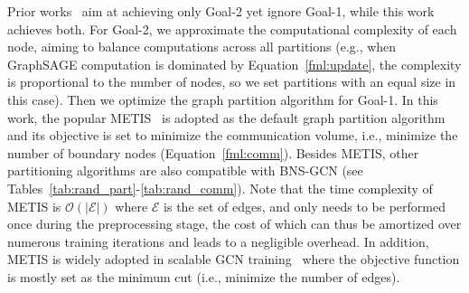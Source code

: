 \documentclass{article}
\begin{document}
Prior works~\citep{tripathy2020reducing,zheng2020distdgl} aim at achieving only Goal-2 yet ignore Goal-1, while this work achieves both.
For Goal-2, we approximate the computational complexity of each node, aiming to balance computations across all partitions (e.g., when GraphSAGE computation is dominated by Equation~\ref{fml:update}, the complexity is proportional to the number of nodes, so we set partitions with an equal size in this case).
Then we optimize the graph partition algorithm for Goal-1.
In this work, the popular METIS~\citep{karypis1998fast} is adopted as the default graph partition algorithm and its objective is set to minimize the communication volume, i.e., minimize the number of boundary nodes (Equation~\ref{fml:comm}).
Besides METIS, other partitioning algorithms are also compatible with BNS-GCN (see Tables~\ref{tab:rand_part}-\ref{tab:rand_comm}). 
Note that the time complexity of METIS is $\mathcal{O}(|\mathcal{E}|)$ where $\mathcal{E}$ is the set of edges, and only needs to be performed once during the preprocessing stage, the cost of which can thus be amortized over numerous training iterations and leads to a negligible overhead. 
In addition, METIS is widely adopted in scalable GCN training~\citep{zhu2019aligraph,zheng2020distdgl,fey2021gnnautoscale,wan2022pipegcn} where the objective function is mostly set as the minimum cut (i.e., minimize the number of edges).
\end{document}
